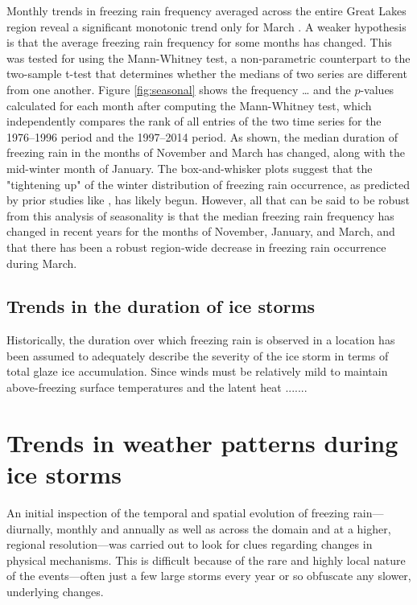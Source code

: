 \documentclass[twocol]{ametsoc}
\begin{document}
Monthly trends in freezing rain frequency averaged across the entire Great Lakes region reveal a significant monotonic trend only for March . A weaker hypothesis is that the average freezing rain frequency for some months has changed. This was tested for using the Mann-Whitney test, a non-parametric counterpart to the two-sample t-test that determines whether the medians of two series are different from one another. Figure \ref{fig:seasonal} shows the frequency … and the $p$-values calculated for each month after computing the Mann-Whitney test, which independently compares the rank of all entries of the two time series for the 1976--1996 period and the 1997--2014 period. As shown, the median duration of freezing rain in the months of November and March has changed, along with the mid-winter month of January. The box-and-whisker plots suggest that the "tightening up" of the winter distribution of freezing rain occurrence, as predicted by prior studies like \citet{cheng2011possible}, has likely begun. However, all that can be said to be robust from this analysis of seasonality is that the median freezing rain frequency has changed in recent years for the months of November, January, and March, and that there has been a robust region-wide decrease in freezing rain occurrence during March.

\subsection{Trends in the duration of ice storms}
Historically, the duration over which freezing rain is observed in a location has been assumed to adequately describe the severity of the ice storm in terms of total glaze ice accumulation. Since winds must be relatively mild to maintain above-freezing surface temperatures and the latent heat .......


\section{Trends in weather patterns during ice storms}
An initial inspection of the temporal and spatial evolution of freezing rain---diurnally, monthly and annually as well as across the domain and at a higher, regional resolution---was carried out to look for clues regarding changes in physical mechanisms. This is difficult because of the rare and highly local nature of the events---often just a few large storms every year or so obfuscate any slower, underlying changes.
\end{document}
